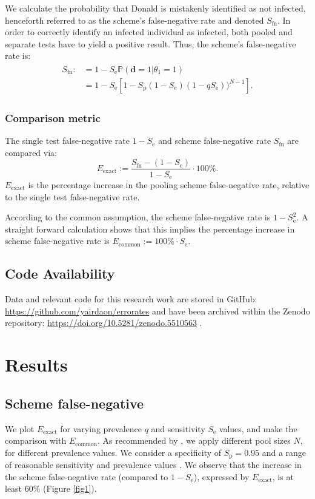 \documentclass{article}
\newcommand{\Se}{S_\text{e}}
\newcommand{\Sp}{S_\text{p}}
\newcommand{\mi}{S_{\text{fn}}}
\newcommand{\err}[1]{E_{\text{{#1}}}}%
\renewcommand{\Pr}{\mathbb{P}}
\newcommand{\data}{\mathbf{d}}
\begin{document}
We calculate the probability that Donald is mistakenly identified as
not infected, henceforth referred to as the scheme's false-negative
rate and denoted $\mi$. In order to correctly identify an infected
individual as infected, both pooled and separate tests have to yield a
positive result. Thus, the scheme's false-negative rate is:
\begin{align}\label{eq:sfn}
    \begin{split}
        \mi :&= 1 - \Se\Pr(\data=1|\theta_1=1)\\
        &= 1 - \Se\left [1 - \Sp(1-\Se)(1-q\Se))^{N-1}\right].
    \end{split}
\end{align}

\subsubsection*{Comparison metric}
The single test false-negative rate $1-\Se$ and scheme false-negative
rate $\mi$ are compared via:
\begin{equation}\label{eq:erel}
\err{exact} := \frac{\mi - (1-\Se)}{1-\Se} \cdot 100\%.
\end{equation}
$\err{exact}$ is the percentage increase in the pooling scheme
false-negative rate, relative to the single test false-negative rate.

According to the common assumption, the scheme false-negative rate is
$1-\Se^2$. A straight forward calculation shows that this implies the
percentage increase in scheme false-negative rate is $\err{common} :=
100\%\cdot \Se$.

\subsection*{Code Availability}
Data and relevant code for this research work are stored in GitHub:
\url{https://github.com/yairdaon/errorates} and have been archived
within the Zenodo repository:
\url{https://doi.org/10.5281/zenodo.5510563} \cite{MyCode}.

\section*{Results}\label{section:results}
\subsection*{Scheme false-negative}
We plot $\err{exact}$ for varying prevalence $q$ and sensitivity $\Se$
values, and make the comparison with $\err{common}$. As recommended by
\cite{DorfmanYuvalDor}, we apply different pool sizes $N$, for
different prevalence values. We consider a specificity of $\Sp=0.95$
\cite{DorfmanYuvalDor} and a range of reasonable sensitivity and
prevalence values \cite{KitComparison, InterpretingCOVID19Test,
  EstimatingRatesLourenco, FalsePositiveEstimate}. We observe that the
increase in the scheme false-negative rate (compared to $1-\Se$),
expressed by $\err{exact}$, is at least $60\%$ (Figure \ref{fig1}).
\end{document}
